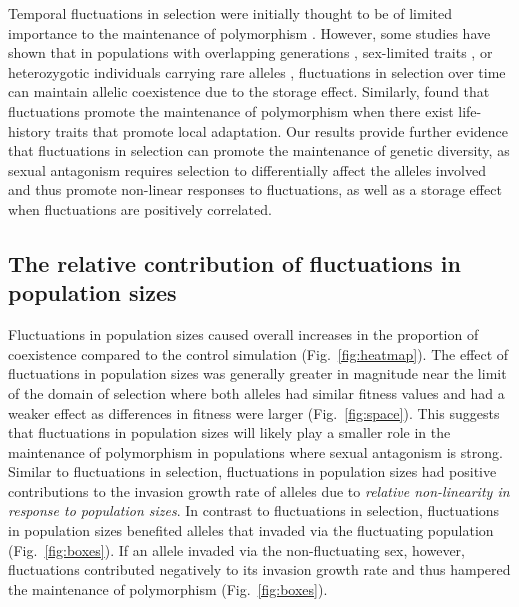 \documentclass[12pt]{article}
\begin{document}
 Temporal fluctuations in selection were initially thought to be of limited importance to the maintenance of polymorphism  \citep{dempster1955maintenance,hedrick1974genetic,hedrick1986genetic}. However, some studies have shown that in populations with overlapping generations \citep{ellner1996patterns,sasaki1995evolutionarily}, sex-limited traits \citep{reinhold2000maintenance}, or heterozygotic individuals carrying rare alleles \citep{schreiber2020factors}, fluctuations in selection over time can maintain allelic coexistence due to the storage effect. Similarly, \citet{connallon2018environmental} found that fluctuations promote the maintenance of polymorphism when there exist life-history traits that promote local adaptation. Our results provide further evidence that fluctuations in selection can promote the maintenance of genetic diversity, as sexual antagonism requires selection to differentially affect the alleles involved and thus promote non-linear responses to fluctuations, as well as a storage effect when fluctuations are positively correlated.


 \subsection*{The relative contribution of fluctuations in population sizes}

 Fluctuations in population sizes caused overall increases in the proportion of coexistence compared to the control simulation  (Fig.~\ref{fig:heatmap}).  The effect of fluctuations in population sizes was generally greater in magnitude near the limit of the domain of selection where both alleles had similar fitness values and had a weaker effect as differences in fitness were larger (Fig.~\ref{fig:space}). This suggests that fluctuations in population sizes will likely play a smaller role in the maintenance of polymorphism in populations where sexual antagonism is strong.  Similar to fluctuations in selection, fluctuations in population sizes had positive contributions to the invasion growth rate of alleles due to \textit{relative non-linearity in response to population sizes}. In contrast to fluctuations in selection, fluctuations in population sizes benefited alleles that invaded via the fluctuating population (Fig.~\ref{fig:boxes}). If an allele invaded via the non-fluctuating sex, however, fluctuations contributed negatively to its invasion growth rate and thus hampered the maintenance of polymorphism (Fig.~\ref{fig:boxes}).
\end{document}
